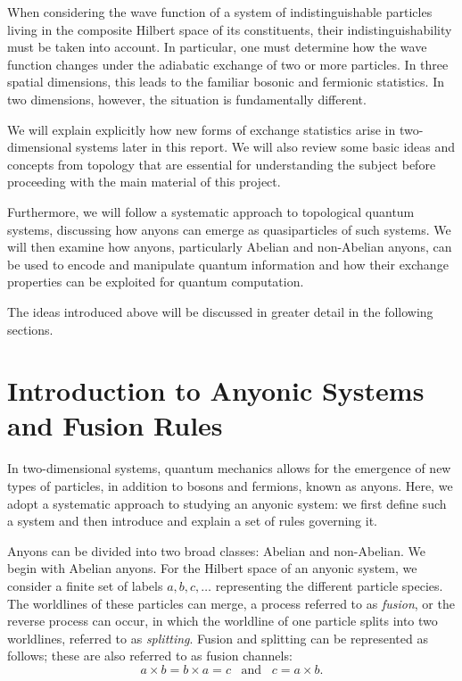 \documentclass[11pt]{article}
\begin{document}
	When considering the wave function of a system of indistinguishable particles living in the composite Hilbert space of its constituents, their indistinguishability must be taken into account. In particular, one must determine how the wave function changes under the adiabatic exchange of two or more particles. In three spatial dimensions, this leads to the familiar bosonic and fermionic statistics. In two dimensions, however, the situation is fundamentally different.
	
	We will explain explicitly how new forms of exchange statistics arise in two-dimensional systems later in this report. We will also review some basic ideas and concepts from topology that are essential for understanding the subject before proceeding with the main material of this project.
	
	Furthermore, we will follow a systematic approach to topological quantum systems, discussing how anyons can emerge as quasiparticles of such systems. We will then examine how anyons, particularly Abelian and non-Abelian anyons, can be used to encode and manipulate quantum information and how their exchange properties can be exploited for quantum computation.
	
	The ideas introduced above will be discussed in greater detail in the following sections.
	
	
	\section*{Introduction to Anyonic Systems and Fusion Rules}
	
	In two-dimensional systems, quantum mechanics allows for the emergence of new types of particles, in addition to bosons and fermions, known as anyons. Here, we adopt a systematic approach to studying an anyonic system: we first define such a system and then introduce and explain a set of rules governing it.
	
	Anyons can be divided into two broad classes: Abelian and non-Abelian. We begin with Abelian anyons. For the Hilbert space of an anyonic system, we consider a finite set of labels $a,b,c,\dots$ representing the different particle species. The worldlines of these particles can merge, a process referred to as \emph{fusion}, or the reverse process can occur, in which the worldline of one particle splits into two worldlines, referred to as \emph{splitting}. Fusion and splitting can be represented as follows; these are also referred to as fusion channels:
	\[
	a \times b = b \times a = c \,\,\,\,\, \text{and}\,\,\,\,\, c = a \times b.
	\]
	
\end{document}
